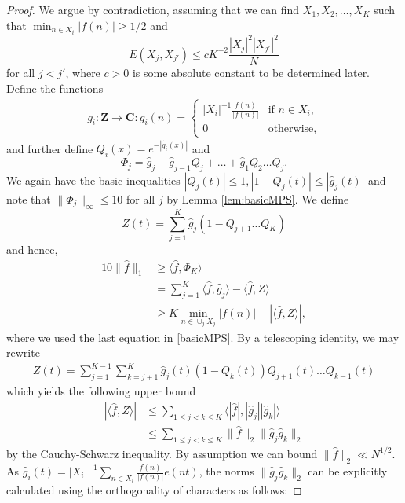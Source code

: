 \documentclass[11pt, reqno]{amsart}
\begin{document}
\begin{proof}
     We argue by contradiction, assuming that we can find $X_1,X_2,\dots,X_K$ such that $\min_{n\in X_i}|f(n)|\geqslant 1/2$ and
    \begin{equation*}
       E(X_j,X_{j'})\leqslant cK^{-2}\frac{|X_j|^2|X_{j'}|^2}{N} 
    \end{equation*} for all $j<j'$, where $c>0$ is some absolute constant to be determined later. Define the functions
    \begin{align*}
        g_i:\mathbf{Z}\to\mathbf{C}:g_i(n)=\begin{cases}
            |X_i|^{-1}\frac{f(n)}{|f(n)|} & \text{if $n\in X_i$,}\\
            0 & \text{otherwise},
        \end{cases}
    \end{align*}
and further define $Q_i(x)=e^{-|\hat{g}_i(x)|}$ and
\begin{equation*}
    \Phi_j=\hat{g}_j+\hat{g}_{j-1}Q_j+\dots+\hat{g}_1Q_2\dots Q_j.
\end{equation*}
We again have the basic inequalities $|Q_j(t)|\leqslant 1, |1-Q_j(t)|\leqslant |\hat{g}_j(t)|$ and note that $\lVert \Phi_j\rVert_\infty\leqslant 10$ for all $j$ by Lemma \ref{lem:basicMPS}. We define
$$Z(t)=\sum_{j=1}^K \hat{g}_j(1-Q_{j+1}\dots Q_K)$$ and hence,
\begin{align}
    10\lVert \hat{f}\rVert_1&\geqslant \langle \hat{f},\Phi_K\rangle\nonumber\\
    &= \sum_{j=1}^K\langle \hat{f},\hat{g}_j\rangle-\langle \hat{f},Z\rangle\nonumber\\
    &\geqslant K\min_{n\in \cup_j X_j}|f(n)|-|\langle \hat{f},Z\rangle|,\label{J,Ebound}
\end{align}
where we used the last equation in \eqref{basicMPS}. By a telescoping identity, we may rewrite \begin{align*}Z(t)=\sum_{j=1}^{K-1}\sum_{k=j+1}^K\hat{g}_j(t)(1-Q_k(t))Q_{j+1}(t)\dots Q_{k-1}(t)
\end{align*}
which yields the following upper bound
\begin{align*}
    |\langle \hat{f},Z\rangle|&\leqslant \sum_{1\leqslant j<k\leqslant K}\langle |\hat{f}|,|\hat{g}_j||\hat{g}_k|\rangle\\
    &\leqslant \sum_{1\leqslant j<k\leqslant K} \lVert \hat{f}\rVert_2\lVert\hat{g}_j\hat{g}_k\rVert_2
\end{align*}
by the Cauchy-Schwarz inequality. 
By assumption we can bound $\lVert \hat{f}\rVert_2 \ll N^{1/2}$. As $\hat{g}_i(t)=|X_i|^{-1}\sum_{n\in X_i}\frac{f(n)}{|f(n)|}e(nt)$, the norms $\lVert\hat{g}_j\hat{g}_k\rVert_2$ can be explicitly calculated using the orthogonality of characters as follows: 

\end{proof}
\end{document}
